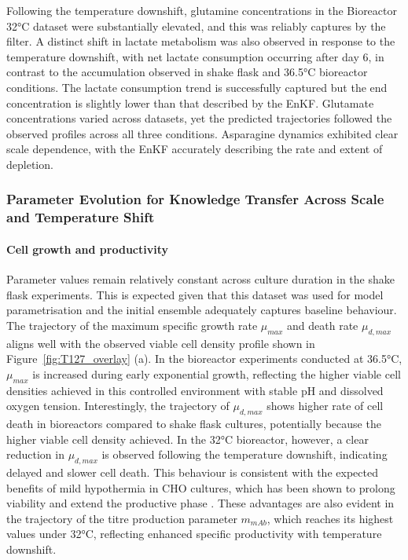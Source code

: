 Following the temperature downshift, glutamine concentrations in the Bioreactor 32°C dataset were substantially elevated, and this was reliably captures by the filter. A distinct shift in lactate metabolism was also observed in response to the temperature downshift, with net lactate consumption occurring after day 6, in contrast to the accumulation observed in shake flask and 36.5°C bioreactor conditions. The lactate consumption trend is successfully captured but the end concentration is slightly lower than that described by the EnKF. Glutamate concentrations varied across datasets, yet the predicted trajectories followed the observed profiles across all three conditions. Asparagine dynamics exhibited clear scale dependence, with the EnKF accurately describing the rate and extent of depletion.


\subsubsection{Parameter Evolution for Knowledge Transfer Across Scale and Temperature Shift}


\paragraph{Cell growth and productivity}

Parameter values remain relatively constant across culture duration in the shake flask experiments. This is expected given that this dataset was used for model parametrisation and the initial ensemble adequately captures baseline behaviour. The trajectory of the maximum specific growth rate $\mu_{max}$ and death rate $\mu_{d,max}$ aligns well with the observed viable cell density profile shown in Figure~\ref{fig:T127_overlay} (a). In the bioreactor experiments conducted at 36.5°C, $\mu_{max}$ is increased during early exponential growth, reflecting the higher viable cell densities achieved in this controlled environment with stable pH and dissolved oxygen tension. Interestingly,  the trajectory of $\mu_{d,max}$ shows higher rate of cell death in bioreactors compared to shake flask cultures, potentially because the higher viable cell density achieved. In the 32°C bioreactor, however, a clear reduction in $\mu_{d,max}$ is observed following the temperature downshift, indicating delayed and slower cell death. This behaviour is consistent with the expected benefits of mild hypothermia in CHO cultures, which has been shown to prolong viability and extend the productive phase \cite{Sou2015HowGlycosylation, Sou2017Model-basedHypothermia}. These advantages are also evident in the trajectory of the titre production parameter $m_{mAb}$, which reaches its highest values under 32°C, reflecting enhanced specific productivity with temperature downshift. 


